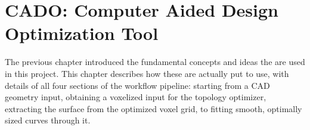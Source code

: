 \chapter{CADO: Computer Aided Design Optimization Tool}
\label{chapter:Implementation}	
The previous chapter introduced the fundamental concepts and ideas the are used in this project. This chapter describes how these are actually put to use, with details of all four sections of the workflow pipeline: starting from a CAD geometry input, obtaining a voxelized input for the topology optimizer, extracting the surface from the optimized voxel grid, to fitting smooth, optimally sized curves through it.














